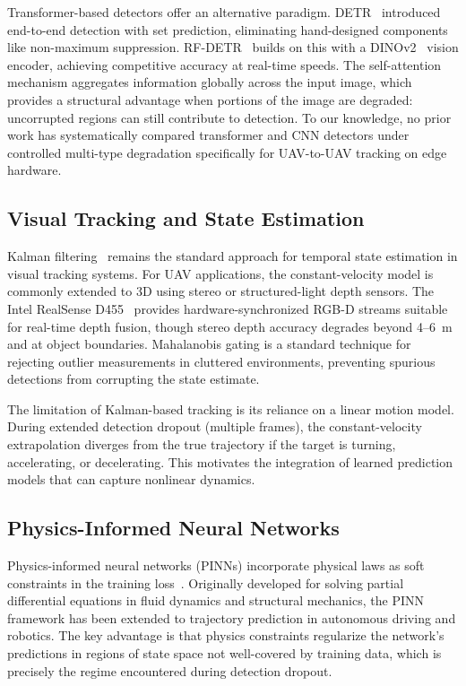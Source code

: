 \documentclass[11pt,letterpaper]{article}
\begin{document}
Transformer-based detectors offer an alternative paradigm. DETR~\cite{carion2020detr} introduced end-to-end detection with set prediction, eliminating hand-designed components like non-maximum suppression. RF-DETR~\cite{rfdetr2025} builds on this with a DINOv2~\cite{oquab2024dinov2} vision encoder, achieving competitive accuracy at real-time speeds. The self-attention mechanism aggregates information globally across the input image, which provides a structural advantage when portions of the image are degraded: uncorrupted regions can still contribute to detection. To our knowledge, no prior work has systematically compared transformer and CNN detectors under controlled multi-type degradation specifically for UAV-to-UAV tracking on edge hardware.

\subsection{Visual Tracking and State Estimation}

Kalman filtering~\cite{kalmanfilter1960} remains the standard approach for temporal state estimation in visual tracking systems. For UAV applications, the constant-velocity model is commonly extended to 3D using stereo or structured-light depth sensors. The Intel RealSense D455~\cite{realsensed455} provides hardware-synchronized RGB-D streams suitable for real-time depth fusion, though stereo depth accuracy degrades beyond 4--6~m and at object boundaries. Mahalanobis gating is a standard technique for rejecting outlier measurements in cluttered environments, preventing spurious detections from corrupting the state estimate.

The limitation of Kalman-based tracking is its reliance on a linear motion model. During extended detection dropout (multiple frames), the constant-velocity extrapolation diverges from the true trajectory if the target is turning, accelerating, or decelerating. This motivates the integration of learned prediction models that can capture nonlinear dynamics.

\subsection{Physics-Informed Neural Networks}

Physics-informed neural networks (PINNs) incorporate physical laws as soft constraints in the training loss~\cite{raissi2019pinn}. Originally developed for solving partial differential equations in fluid dynamics and structural mechanics, the PINN framework has been extended to trajectory prediction in autonomous driving and robotics. The key advantage is that physics constraints regularize the network's predictions in regions of state space not well-covered by training data, which is precisely the regime encountered during detection dropout.
\end{document}
